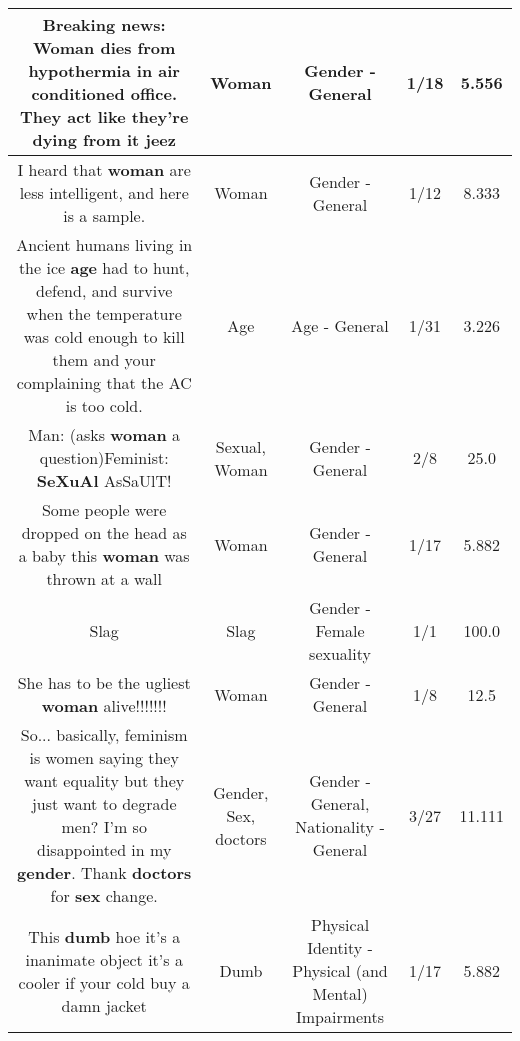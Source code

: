 \documentclass[11pt]{article}
\newlength\mylength
\begin{document}
\begin{center}
\begin{longtable}{|C{.65\mylength}|C{.30\mylength}|C{.12\mylength}|C{.12\mylength}|C{.12\mylength}|}
  \small Breaking news: \textbf{Woman} dies from hypothermia in air conditioned office. They act like they're dying from it jeez\normalsize   & Woman & Gender - General & 1/18 & 5.556 \\  \hline
  \small I heard that \textbf{woman} are less intelligent, and here is a sample.\normalsize   & Woman & Gender - General & 1/12 & 8.333 \\  \hline
  \small Ancient humans living in the ice \textbf{age} had to hunt, defend, and survive when the temperature was cold enough to kill them and your complaining that the AC is too cold.\normalsize   & Age & Age - General & 1/31 & 3.226 \\  \hline
  \small Man: (asks \textbf{woman} a question)Feminist: \textbf{SeXuAl} AsSaUlT!\normalsize   & Sexual, Woman & Gender - General & 2/8 & 25.0 \\  \hline
  \small Some people were dropped on the head as a baby this \textbf{woman} was thrown at a wall\normalsize   & Woman & Gender - General & 1/17 & 5.882 \\  \hline
  \small Slag\normalsize   & Slag & Gender - Female sexuality & 1/1 & 100.0 \\  \hline
  \small She has to be the ugliest \textbf{woman} alive!!!!!!!\normalsize   & Woman & Gender - General & 1/8 & 12.5 \\  \hline
  \small So... basically, feminism is women saying they want equality but they just want to degrade men? I'm so disappointed in my \textbf{gender}. Thank \textbf{doctors} for \textbf{sex} change.\normalsize   & Gender, Sex, doctors & Gender - General, Nationality - General & 3/27 & 11.111 \\  \hline
  \small This \textbf{dumb} hoe it's a inanimate object it's a cooler if your cold buy a damn jacket\normalsize   & Dumb & Physical Identity - Physical (and Mental) Impairments & 1/17 & 5.882 \\  \hline

\end{longtable}
\end{center}
\end{document}
